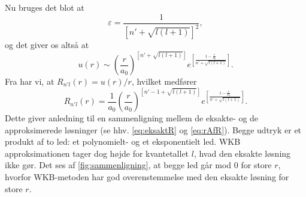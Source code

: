 Nu bruges det blot at
\begin{equation}
    \varepsilon = \frac{1}{\left[n'+\sqrt{l(l+1)}\right]^2},
\end{equation}
og det giver os altså at
\begin{equation}
    u(r) \sim {\left(\frac{r}{a_0}\right)}^{\left[n'+\sqrt{l(l+1)}\right]} e^{\left[\frac{1-\frac{r}{a_0}}{n'+\sqrt{l(l+1)}}\right]}.
\end{equation}
Fra \cite[s. 140]{griffiths} har vi, at $R_{n'l}(r) = u(r)/r$, hvilket medfører 
\begin{equation}
    R_{n'l}(r) = \frac{1}{a_0}{\left(\frac{r}{a_0}\right)}^{\left[n'-1+\sqrt{l(l+1)}\right]} e^{\left[\frac{1-\frac{r}{a_0}}{n'+\sqrt{l(l+1)}}\right]}.
  \label{eq:rAfR}
\end{equation}
Dette giver anledning til en sammenligning mellem de eksakte-  og de approksimerede løsninger (se hhv. \cref{eq:eksaktR} og \cref{eq:rAfR}). Begge udtryk er et produkt af to led: et polynomielt- og et eksponentielt led. WKB approksimationen tager dog højde for kvantetallet $l$, hvad den eksakte løsning ikke gør. Det ses af \cref{fig:sammenligning}, at begge led går mod $0$ for store $r$, hvorfor WKB-metoden har god overenstemmelse med den eksakte løsning for store $r$.

